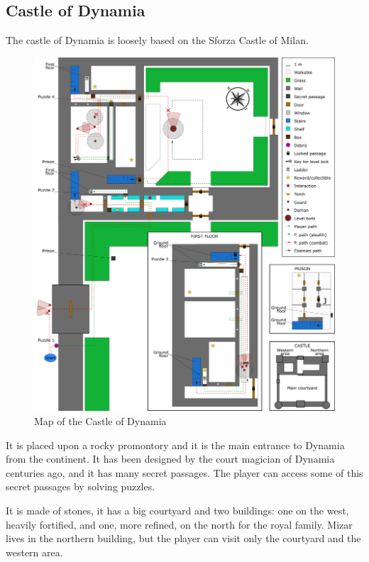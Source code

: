 \subsection{Castle of Dynamia}
The castle of Dynamia is loosely based on the Sforza Castle of Milan.

\begin{center}
  \begin{figure}[H]
    \centering
    \includegraphics[width=\textwidth]{Images/Maps/castleOfDynamia}
    \caption{Map of the Castle of Dynamia}
  \end{figure}
\end{center}

It is placed upon a rocky promontory and it is the main entrance to Dynamia from the continent. It has been designed by the court magician of Dynamia centuries ago, and it has many secret passages. The player can access some of this secret passages by solving puzzles.

It is made of stones, it has a big courtyard and two buildings: one on the west, heavily fortified, and one, more refined, on the north for the royal family. Mizar lives in the northern building, but the player can visit only the courtyard and the western area.

